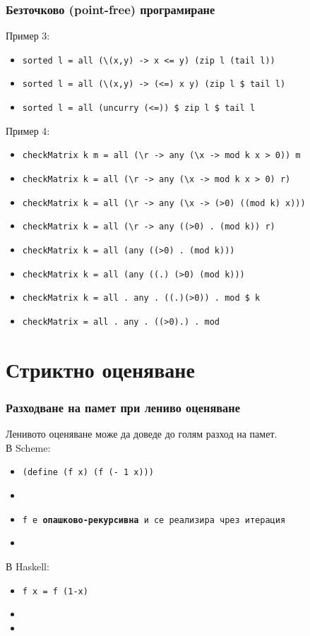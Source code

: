 \documentclass{beamer}
\begin{document}
\begin{frame}
  \frametitle{Безточково (point-free) програмиране}
  Пример 3:
  \begin{itemize}[<+->]
  \item \tt{sorted l = all (\textbackslash(x,y) -> x <= y) (zip l (tail l))}
  \item \tt{sorted l = all (\textbackslash(x,y) -> (<=) x y) (zip l \$ tail l)}
  \item \tt{sorted l = all (uncurry (<=)) \$ zip l \$ tail l}
  \end{itemize}
  \onslide<+->
  Пример 4:
  \begin{itemize}[<+->]
  \small
  \item \tt{checkMatrix k m = all (\textbackslash r -> any (\textbackslash x -> mod k x > 0)) m}
  \item \tt{checkMatrix k = all (\textbackslash r -> any (\textbackslash x -> mod k x > 0) r)}
  \item \tt{checkMatrix k = all (\textbackslash r -> any (\textbackslash x -> (>0) ((mod k) x)))}
  \item \tt{checkMatrix k = all (\textbackslash r -> any ((>0) . (mod k)) r)}
  \item \tt{checkMatrix k = all (any ((>0) . (mod k)))}
  \item \tt{checkMatrix k = all (any ((.) (>0) (mod k)))}
  \item \tt{checkMatrix k = all . any . ((.)(>0)) . mod \$ k}
  \item \tt{checkMatrix = all . any . ((>0).) . mod}
  \end{itemize}
\end{frame}
\section{Стриктно оценяване}

\begin{frame}
  \frametitle{Разходване на памет при лениво оценяване}
  Ленивото оценяване може да доведе до голям разход на памет.\\[1em]\pause
  В Scheme:
  \begin{itemize}[<+->]
  \item \tt{(define (f x) (f (- 1 x)))}
  \item {}
  \item \tt f е \textbf{опашково-рекурсивна} и се реализира чрез итерация
  \item {}
  \end{itemize}
  \onslide<+->
  В Haskell:
  \begin{itemize}[<+->]
  \item \tt{f x = f (1-x)}
  \item {}
  \item {}
  \end{itemize}
\end{frame}
\end{document}
